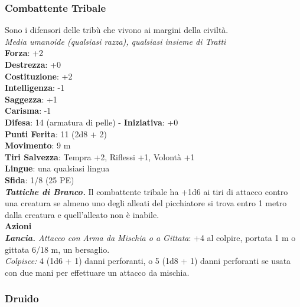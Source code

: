\begin{multicols}{2}
\subsubsection{Combattente Tribale}
Sono i difensori delle tribù che vivono ai margini della civiltà.\\
\emph{Media umanoide (qualsiasi razza), qualsiasi insieme di Tratti}\\
\textbf{Forza}: +2\\
\textbf{Destrezza}: +0\\
\textbf{Costituzione}: +2\\
\textbf{Intelligenza}: -1\\
\textbf{Saggezza}: +1\\
\textbf{Carisma}: -1\\
\textbf{Difesa}: 14 (armatura di pelle) - \textbf{Iniziativa}: +0\\
\textbf{Punti Ferita}: 11 (2d8 + 2)\\
\textbf{Movimento}: 9 m\\
\textbf{Tiri Salvezza}: Tempra +2, Riflessi +1, Volontà +1 \\
\textbf{Lingue}: una qualsiasi lingua\\
\textbf{Sfida}: 1/8 (25 PE)\smallskip\\
\emph{\textbf{Tattiche di Branco.}} Il combattente tribale ha +1d6 ai tiri di attacco contro una creatura se almeno uno degli alleati del picchiatore si trova entro 1 metro dalla creatura e quell'alleato non è inabile.\\
\smallskip\textbf{Azioni}\\
\emph{\textbf{Lancia.} Attacco con Arma da Mischia o a Gittata}: +4 al colpire, portata 1 m o gittata 6/18 m, un bersaglio.\\
\emph{Colpisce:} 4 (1d6 + 1) danni perforanti, o 5 (1d8 + 1) danni perforanti se usata con due mani per effettuare un attacco da mischia.\\

\subsubsection{Druido}


\end{multicols}
